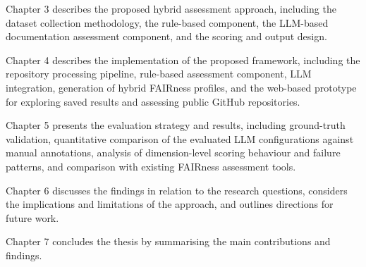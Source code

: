 Chapter 3 describes the proposed hybrid assessment approach, 
including the dataset collection methodology, the rule-based
component, the LLM-based documentation assessment component, and
the scoring and output design.

Chapter 4 describes the implementation of the proposed framework,
including the repository processing pipeline, rule-based assessment
component, LLM integration, generation of hybrid FAIRness profiles,
and the web-based prototype for exploring saved results and assessing
public GitHub repositories.

Chapter 5 presents the evaluation strategy and results, including
ground-truth validation, quantitative comparison of the evaluated
LLM configurations against manual annotations, analysis of
dimension-level scoring behaviour and failure patterns, and
comparison with existing FAIRness assessment tools.

Chapter 6 discusses the findings in relation to the research
questions, considers the implications and limitations of the
approach, and outlines directions for future work.

Chapter 7 concludes the thesis by summarising the main contributions
and findings.